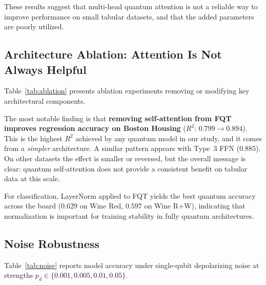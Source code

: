 These results suggest that multi-head quantum attention is not a reliable
way to improve performance on small tabular datasets, and that the added
parameters are poorly utilized.

\subsection{Architecture Ablation: Attention Is Not Always Helpful}
\label{sec:results-ablation}

Table~\ref{tab:ablation} presents ablation experiments removing or modifying
key architectural components.

The most notable finding is that \textbf{removing self-attention from FQT
improves regression accuracy on Boston Housing} ($R^2$: $0.799 \to 0.894$).
This is the highest $R^2$ achieved by any quantum model in our study, and it
comes from a \emph{simpler} architecture.  A similar pattern appears with
Type~3 FFN ($0.885$).  On other datasets the effect is smaller or reversed,
but the overall message is clear: quantum self-attention does not provide a
consistent benefit on tabular data at this scale.

For classification, LayerNorm applied to FQT yields the best quantum
accuracy across the board ($0.629$ on Wine Red, $0.597$ on Wine R+W),
indicating that normalization is important for training stability in fully
quantum architectures.

\subsection{Noise Robustness}
\label{sec:results-noise}

Table~\ref{tab:noise} reports model accuracy under single-qubit depolarizing
noise at strengths $p_d \in \{0.001, 0.005, 0.01, 0.05\}$.

